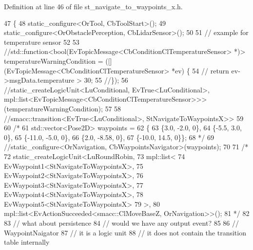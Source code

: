 Definition at line 46 of file st\+\_\+navigate\+\_\+to\+\_\+waypoints\+\_\+x.\+h.


\begin{DoxyCode}
47   \{
48     static\_configure<OrTool, CbToolStart>();
49     static\_configure<OrObstaclePerception, CbLidarSensor>();
50     
51     \textcolor{comment}{// example for temperature sensor}
52 
53     \textcolor{comment}{//std::function<bool(EvTopicMessage<CbConditionClTemperatureSensor> *)> temperatureWarningCondition =
       ([](EvTopicMessage<CbConditionClTemperatureSensor> *ev) \{}
54     \textcolor{comment}{//  return ev->msgData.temperature > 30;}
55     \textcolor{comment}{//\});}
56     \textcolor{comment}{//static\_createLogicUnit<LuConditional, EvTrue<LuConditional>,
       mpl::list<EvTopicMessage<CbConditionClTemperatureSensor>>>(temperatureWarningCondition);}
57 
58     \textcolor{comment}{//smacc::transition<EvTrue<LuConditional>, StNavigateToWaypointsX>>}
59 
60     \textcolor{comment}{/*}
61 \textcolor{comment}{    std::vector<Pose2D> waypoints =}
62 \textcolor{comment}{        \{}
63 \textcolor{comment}{            \{3.0, -2.0, 0\},}
64 \textcolor{comment}{            \{-5.5, 3.0, 0\},}
65 \textcolor{comment}{            \{-11.0, -5.0, 0\},}
66 \textcolor{comment}{            \{2.0, -8.58, 0\},}
67 \textcolor{comment}{            \{-10.0, 14.5, 0\}\};}
68 \textcolor{comment}{*/}
69     \textcolor{comment}{//static\_configure<OrNavigation, CbWaypointsNavigator>(waypoints);}
70 
71     \textcolor{comment}{/*}
72 \textcolor{comment}{    static\_createLogicUnit<LuRoundRobin, }
73 \textcolor{comment}{                              mpl::list<}
74 \textcolor{comment}{                                   EvWaypoint1<StNavigateToWaypointsX>,}
75 \textcolor{comment}{                                   EvWaypoint2<StNavigateToWaypointsX>,}
76 \textcolor{comment}{                                   EvWaypoint3<StNavigateToWaypointsX>, }
77 \textcolor{comment}{                                   EvWaypoint4<StNavigateToWaypointsX>,}
78 \textcolor{comment}{                                   EvWaypoint5<StNavigateToWaypointsX>}
79 \textcolor{comment}{                                  >, }
80 \textcolor{comment}{                         mpl::list<EvActionSucceeded<smacc::ClMoveBaseZ, OrNavigation>>();}
81 \textcolor{comment}{                         */}
82 
83     \textcolor{comment}{// what about persistence}
84     \textcolor{comment}{// would we have any output event?}
85 
86     \textcolor{comment}{// WaypointNaigator}
87     \textcolor{comment}{// it is a logic unit}
88     \textcolor{comment}{// it does not contain the transition table internally}

\end{DoxyCode}
